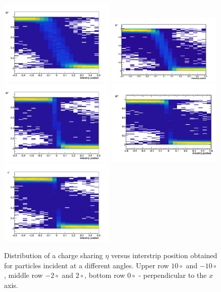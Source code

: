  
 
\begin{figure}[tbph]
\begin{center}
\includegraphics[width = 0.49\textwidth]{figures/eta/eta_2d_10.png} 
\includegraphics[width = 0.49\textwidth]{figures/eta/eta_2d_neg10.png}
\includegraphics[width = 0.49\textwidth]{figures/eta/eta_2d_2.png} 
\includegraphics[width = 0.49\textwidth]{figures/eta/eta_2d_neg2.png} 
\includegraphics[width = 0.49\textwidth]{figures/eta/eta_2d_0.png} 

\caption{Distribution of a charge sharing $\eta$ versus interstrip position obtained for particles incident at a different angles. Upper row $10\circ$ and $-10\circ$, middle row $-2 \circ$ and $2 \circ$, bottom row $0\circ$ - perpendicular to the $x$ axis.    }
\label{fig:eta_distribution_2d}
 \end{center}
 \end{figure}
 
